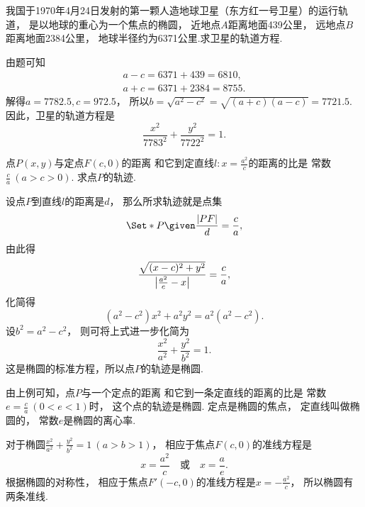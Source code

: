 \begin{example}
我国于1970年4月24日发射的第一颗人造地球卫星（东方红一号卫星）的运行轨道，
是以地球的重心为一个焦点的椭圆，
近地点\(A\)距离地面439公里，
远地点\(B\)距离地面2384公里，
地球半径约为6371公里.求卫星的轨道方程.
\begin{solution}
由题可知\begin{gather*}
	a - c = 6371 + 439 = 6810, \\
	a + c = 6371 + 2384 = 8755.
\end{gather*}
解得\(
	a=7782.5,
	c=972.5
\)，
所以\(
	b
	=\sqrt{a^2-c^2}
	=\sqrt{(a+c)(a-c)}
	=7721.5
\).
因此，卫星的轨道方程是\begin{equation*}
	\frac{x^2}{7783^2}+\frac{y^2}{7722^2}=1.
\end{equation*}
\end{solution}
\end{example}

\begin{example}
点\(P(x,y)\)与定点\(F(c,0)\)的距离
和它到定直线\(l: x = \frac{a^2}{c}\)的距离的比是
常数\(\frac{c}{a}\ (a > c > 0)\).
求点\(P\)的轨迹.
\begin{solution}
设点\(P\)到直线\(l\)的距离是\(d\)，
那么所求轨迹就是点集\begin{equation*}
	\Set*{ P \given \frac{\LineSegmentLength{PF}}{d} = \frac{c}{a} },
\end{equation*}
由此得\begin{equation*}
	\frac{\sqrt{(x-c)^2+y^2}}{\abs{\frac{a^2}{c}-x}} = \frac{c}{a},
\end{equation*}
化简得\begin{equation*}
	(a^2-c^2)x^2 + a^2 y^2 = a^2(a^2-c^2).
\end{equation*}
设\(b^2=a^2-c^2\)，
则可将上式进一步化简为\begin{equation*}
	\frac{x^2}{a^2}+\frac{y^2}{b^2}=1.
\end{equation*}
这是椭圆的标准方程，所以点\(P\)的轨迹是椭圆.
\end{solution}
\end{example}
\begin{remark}
由上例可知，点\(P\)与一个定点的距离
和它到一条定直线的距离的比是
常数\(e = \frac{c}{a}\ (0 < e < 1)\)时，
这个点的轨迹是椭圆.
定点是椭圆的焦点，
定直线叫做椭圆的，
常数\(e\)是椭圆的离心率.
\end{remark}

对于椭圆\(\frac{x^2}{a^2}+\frac{y^2}{b^2}=1\ (a>b>1)\)，
相应于焦点\(F(c,0)\)的准线方程是\begin{equation*}
	x = \frac{a^2}{c}
	\quad\text{或}\quad
	x = \frac{a}{e}.
\end{equation*}
根据椭圆的对称性，
相应于焦点\(F'(-c,0)\)的准线方程是\(x=-\frac{a^2}{c}\)，
所以椭圆有两条准线.

